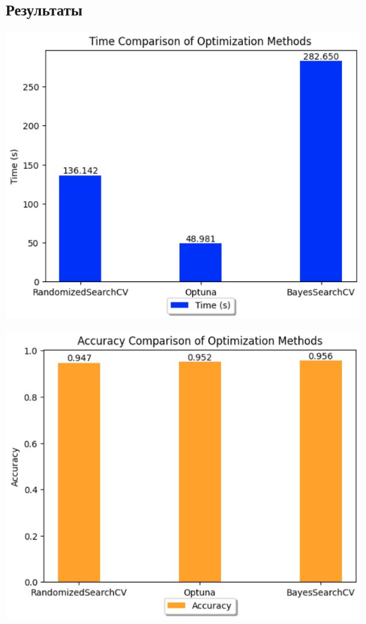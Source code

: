 \documentclass{article}
\begin{document}
\subsection{Результаты}
\begin{center}
    \includegraphics[width=\textwidth]{figures/time.jpg}
\end{center}

\begin{center}
    \includegraphics[width=\textwidth]{figures/accuracy.jpg}
\end{center}
\end{document}
